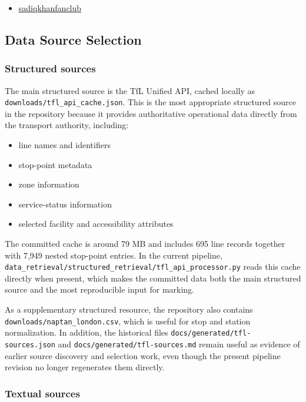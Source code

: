 \documentclass[
  11pt,
  a4paper,
]{article}
\providecommand{\tightlist}{%
  \setlength{\itemsep}{0pt}\setlength{\parskip}{0pt}}
\begin{document}
\begin{itemize}
\tightlist
\item
  \href{https://github.com/cobogo124/sadiqkhanfanclub}{sadiqkhanfanclub}
\end{itemize}

\subsection{Data Source Selection}\label{data-source-selection}

\subsubsection{Structured sources}\label{structured-sources}

The main structured source is the TfL Unified API, cached locally as
\texttt{downloads/tfl\_api\_cache.json}. This is the most appropriate
structured source in the repository because it provides authoritative
operational data directly from the transport authority, including:

\begin{itemize}
\tightlist
\item
  line names and identifiers
\item
  stop-point metadata
\item
  zone information
\item
  service-status information
\item
  selected facility and accessibility attributes
\end{itemize}

The committed cache is around 79 MB and includes 695 line records
together with 7,949 nested stop-point entries. In the current pipeline,
\texttt{data\_retrieval/structured\_retrieval/tfl\_api\_processor.py}
reads this cache directly when present, which makes the committed data
both the main structured source and the most reproducible input for
marking.

As a supplementary structured resource, the repository also contains
\texttt{downloads/naptan\_london.csv}, which is useful for stop and
station normalization. In addition, the historical files
\texttt{docs/generated/tfl-sources.json} and
\texttt{docs/generated/tfl-sources.md} remain useful as evidence of
earlier source discovery and selection work, even though the present
pipeline revision no longer regenerates them directly.

\subsubsection{Textual sources}\label{textual-sources}
\end{document}
